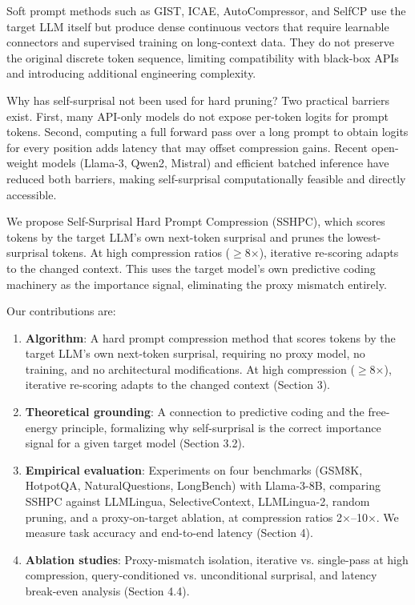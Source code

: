 \documentclass[11pt,letterpaper]{article}
\begin{document}
Soft prompt methods such as GIST, ICAE, AutoCompressor, and SelfCP use the target LLM itself but produce dense continuous vectors that require learnable connectors and supervised training on long-context data. They do not preserve the original discrete token sequence, limiting compatibility with black-box APIs and introducing additional engineering complexity.

Why has self-surprisal not been used for hard pruning? Two practical barriers exist. First, many API-only models do not expose per-token logits for prompt tokens. Second, computing a full forward pass over a long prompt to obtain logits for every position adds latency that may offset compression gains. Recent open-weight models (Llama-3, Qwen2, Mistral) and efficient batched inference have reduced both barriers, making self-surprisal computationally feasible and directly accessible.

We propose Self-Surprisal Hard Prompt Compression (SSHPC), which scores tokens by the target LLM's own next-token surprisal and prunes the lowest-surprisal tokens. At high compression ratios ($\ge$8$\times$), iterative re-scoring adapts to the changed context. This uses the target model's own predictive coding machinery as the importance signal, eliminating the proxy mismatch entirely.

Our contributions are:

\begin{enumerate}
  \item \textbf{Algorithm}: A hard prompt compression method that scores tokens by the target LLM's own next-token surprisal, requiring no proxy model, no training, and no architectural modifications. At high compression ($\ge$8$\times$), iterative re-scoring adapts to the changed context (Section 3).
  \item \textbf{Theoretical grounding}: A connection to predictive coding and the free-energy principle, formalizing why self-surprisal is the correct importance signal for a given target model (Section 3.2).
  \item \textbf{Empirical evaluation}: Experiments on four benchmarks (GSM8K, HotpotQA, NaturalQuestions, LongBench) with Llama-3-8B, comparing SSHPC against LLMLingua, SelectiveContext, LLMLingua-2, random pruning, and a proxy-on-target ablation, at compression ratios 2$\times$--10$\times$. We measure task accuracy and end-to-end latency (Section 4).
  \item \textbf{Ablation studies}: Proxy-mismatch isolation, iterative vs. single-pass at high compression, query-conditioned vs. unconditional surprisal, and latency break-even analysis (Section 4.4).
\end{enumerate}
\end{document}
